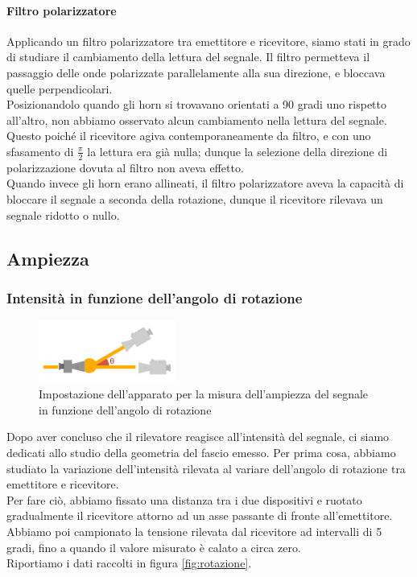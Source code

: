 \documentclass[letterpaper,12pt]{article}
\begin{document}
\paragraph*{Filtro polarizzatore}
Applicando un filtro polarizzatore tra emettitore e ricevitore, siamo stati in grado di studiare il cambiamento della lettura del segnale.
Il filtro permetteva il passaggio delle onde polarizzate parallelamente alla sua direzione, e bloccava quelle perpendicolari.\\
Posizionandolo quando gli horn si trovavano orientati a 90 gradi uno rispetto all'altro, non abbiamo osservato alcun cambiamento nella lettura del segnale. 
Questo poiché il ricevitore agiva contemporaneamente da filtro, e con uno sfasamento di $\frac{\pi}{2}$ la lettura era già nulla; dunque la
selezione della direzione di polarizzazione dovuta al filtro non aveva effetto.\\
Quando invece gli horn erano allineati, il filtro polarizzatore aveva la capacità di bloccare il segnale a seconda della rotazione, dunque il ricevitore
rilevava un segnale ridotto o nullo.


\subsection{Ampiezza}
\subsubsection{Intensità in funzione dell'angolo di rotazione}

\begin{figure}[h!]
    \centering
    \includegraphics[width = 0.4\textwidth]{ampiezza rotazione.jpg}
    \caption{Impostazione dell'apparato per la misura dell'ampiezza del segnale in funzione dell'angolo di rotazione}
    \label{fig:ampiezza_angolo}
\end{figure}
\newpage

Dopo aver concluso che il rilevatore reagisce all'intensità del segnale, ci siamo dedicati allo studio della geometria
del fascio emesso. Per prima cosa, abbiamo studiato la variazione dell'intensità rilevata al variare dell'angolo di rotazione
tra emettitore e ricevitore.\\
Per fare ciò, abbiamo fissato una distanza tra i due dispositivi e ruotato gradualmente il ricevitore attorno ad un asse
passante di fronte all'emettitore. Abbiamo poi campionato la tensione rilevata dal ricevitore ad intervalli di 5 gradi, fino a quando
il valore misurato è calato a circa zero.\\
Riportiamo i dati raccolti in figura \ref{fig:rotazione}.\\
\end{document}
